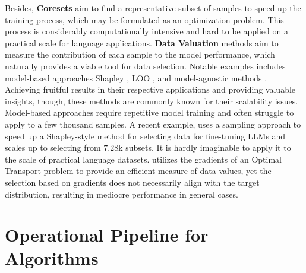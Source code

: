 \documentclass{article} %
\begin{document}
\begin{appendices}{}
Besides, \textbf{Coresets} \citep{borsos2020coresets, mirzasoleiman2020coresets} aim to find a representative subset of samples to speed up the training process, which may be formulated as an optimization problem. This process is considerably computationally intensive and hard to be applied on a practical scale for language applications. \textbf{Data Valuation} methods aim to measure the contribution of each sample to the model performance, which naturally provides a viable tool for data selection. Notable examples includes model-based approaches Shapley \citep{jia2019efficient, ghorbani2019data}, LOO \citep{ghorbani2019data, koh2017understanding}, and model-agnostic methods \citep{just2023lava, kwon2023data}. Achieving fruitful results in their respective applications and providing valuable insights, though, these methods are commonly known for their scalability issues. Model-based approaches require repetitive model training and often struggle to apply to a few thousand samples. A recent example, \citep{schoch2023data} uses a sampling approach to speed up a Shapley-style method for selecting data for fine-tuning LLMs and scales up to selecting from $7.28$k subsets. It is hardly imaginable to apply it to the scale of practical language datasets. \citep{just2023lava} utilizes the gradients of an Optimal Transport problem to provide an efficient measure of data values, yet the selection based on gradients does not necessarily align with the target distribution, resulting in mediocre performance in general cases. 



\section{Operational Pipeline for Algorithms}
\label{app:operation}


\end{appendices}
\end{document}
